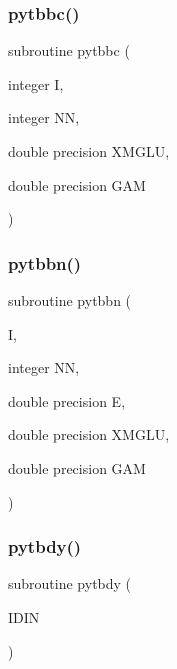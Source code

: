 \subsubsection{\texorpdfstring{pytbbc()}{pytbbc()}}
{\footnotesize\ttfamily subroutine pytbbc (\begin{DoxyParamCaption}\item[{integer}]{I,  }\item[{integer}]{NN,  }\item[{double precision}]{X\+M\+G\+LU,  }\item[{double precision}]{G\+AM }\end{DoxyParamCaption})}

\mbox{\label{pythia-6_84_824_8f_a590e74787b29c2abd5a46aa6489d5219}} 
\subsubsection{\texorpdfstring{pytbbn()}{pytbbn()}}
{\footnotesize\ttfamily subroutine pytbbn (\begin{DoxyParamCaption}\item[{}]{I,  }\item[{integer}]{NN,  }\item[{double precision}]{E,  }\item[{double precision}]{X\+M\+G\+LU,  }\item[{double precision}]{G\+AM }\end{DoxyParamCaption})}

\mbox{\label{pythia-6_84_824_8f_a89821a60f56d9d359eb0d345f14611f4}} 
\subsubsection{\texorpdfstring{pytbdy()}{pytbdy()}}
{\footnotesize\ttfamily subroutine pytbdy (\begin{DoxyParamCaption}\item[{}]{I\+D\+IN }\end{DoxyParamCaption})}

\mbox{\label{pythia-6_84_824_8f_af4c86fb70caec2eba026ee2c81af861f}} 
